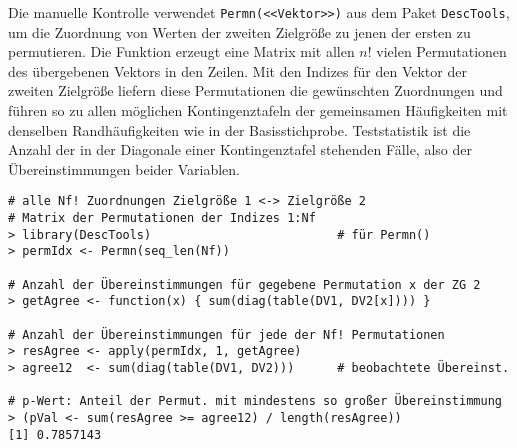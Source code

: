 Die manuelle Kontrolle verwendet \lstinline!Permn(<<Vektor>>)! aus dem Paket \lstinline!DescTools!, um die Zuordnung von Werten der zweiten Zielgröße zu jenen der ersten zu permutieren. Die Funktion erzeugt eine Matrix mit allen $n!$ vielen Permutationen des übergebenen Vektors in den Zeilen. Mit den Indizes für den Vektor der zweiten Zielgröße liefern diese Permutationen die gewünschten Zuordnungen und führen so zu allen möglichen Kontingenztafeln der gemeinsamen Häufigkeiten mit denselben Randhäufigkeiten wie in der Basisstichprobe. Teststatistik ist die Anzahl der in der Diagonale einer Kontingenztafel stehenden Fälle, also der Übereinstimmungen beider Variablen.
\begin{lstlisting}
# alle Nf! Zuordnungen Zielgröße 1 <-> Zielgröße 2
# Matrix der Permutationen der Indizes 1:Nf
> library(DescTools)                          # für Permn()
> permIdx <- Permn(seq_len(Nf))

# Anzahl der Übereinstimmungen für gegebene Permutation x der ZG 2
> getAgree <- function(x) { sum(diag(table(DV1, DV2[x]))) }

# Anzahl der Übereinstimmungen für jede der Nf! Permutationen
> resAgree <- apply(permIdx, 1, getAgree)
> agree12  <- sum(diag(table(DV1, DV2)))      # beobachtete Übereinst.

# p-Wert: Anteil der Permut. mit mindestens so großer Übereinstimmung
> (pVal <- sum(resAgree >= agree12) / length(resAgree))
[1] 0.7857143
\end{lstlisting}
